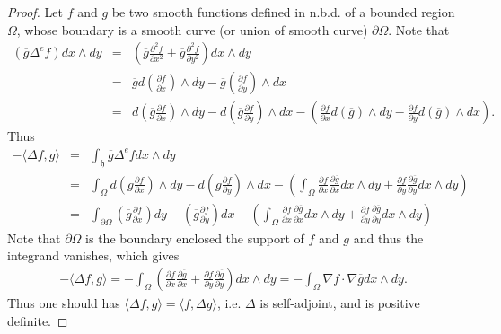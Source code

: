 \documentclass[11pt,reqno]{amsart}
\newcommand{\bna}{\begin{eqnarray*}}
\newcommand{\ena}{\end{eqnarray*}}
\newcommand{\mk}{\mathfrak}
\theoremstyle{definition}
\begin{document}
\begin{proof}
Let $f$ and $g$ be two smooth functions defined in n.b.d. of a bounded region $\Omega$,
whose boundary is a smooth curve (or union of smooth curve) $\partial \Omega$.
Note that
\bna
(\overline g\Delta^ef )dx\wedge dy&=&\left(\overline g\frac{\partial ^2f}{\partial x^2}
+\overline g\frac{\partial ^2f}{\partial y^2}\right)dx\wedge dy\\
&=&\overline g d\left(\frac{\partial f}{\partial x}\right)\wedge dy-\overline g
\left(\frac{\partial f}{\partial y}\right)\wedge dx\\
&=&d\left(\overline g
\frac{\partial f}{\partial x}\right)\wedge dy-
d\left(\overline g\frac{\partial f}{\partial y}\right)\wedge dx
-
\left(\frac{\partial f}{\partial x}d(\overline g) \wedge dy
-
\frac{\partial f}{\partial y} d(\overline g)\wedge dx\right).
\ena
Thus
\bna
-\langle \Delta f,g\rangle&=&\int_{\mk h}\overline{g} \Delta^e fdx\wedge dy
\\
&=&
\int_{\Omega} d\left(\overline g
\frac{\partial f}{\partial x}\right)\wedge dy-
d\left(\overline g\frac{\partial f}{\partial y}\right)\wedge dx
-
\left(\int_{\Omega} \frac{\partial f}{\partial x}\frac{\partial \overline g}{\partial x}dx\wedge dy
+
\frac{\partial f}{\partial y}\frac{\partial \overline g}{\partial y}dx\wedge dy\right)\\
&=&
\int_{\partial\Omega} \left(\overline g
\frac{\partial f}{\partial x}\right)dy-
\left(\overline g\frac{\partial f}{\partial y}\right)dx
-
\left(\int_{\Omega} \frac{\partial f}{\partial x}\frac{\partial \overline g}{\partial x}dx\wedge dy
+
\frac{\partial f}{\partial y}\frac{\partial \overline g}{\partial y}dx\wedge dy\right)
\ena
Note that $\partial \Omega$ is the boundary enclosed the support of $f$ and $g$ and thus the integrand vanishes, which gives
\bna
-\langle \Delta f,g\rangle=-\int_{\Omega}
\left(\frac{\partial f}{\partial x}\frac{\partial \overline g}{\partial x}+
\frac{\partial f}{\partial y}\frac{\partial \overline{g}}{\partial y}\right)dx\wedge dy
=-\int_{\Omega}\nabla f\cdot \nabla\overline g dx\wedge dy.
\ena
Thus one should has $\langle\Delta f,g\rangle=\langle f,\Delta g\rangle$,
i.e. $\Delta$ is self-adjoint,  and is positive definite.


\end{proof}
\end{document}
